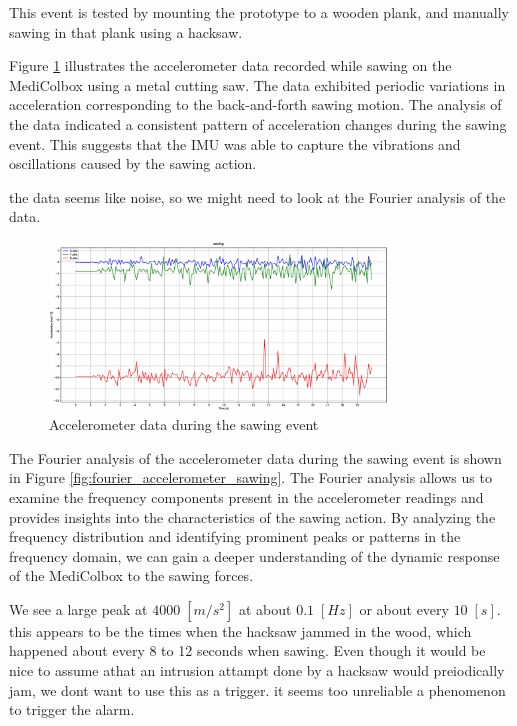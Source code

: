 \documentclass[../main.tex]{subfiles}
\begin{document}
This event is tested by mounting the prototype to a wooden plank, and manually sawing in that plank using a hacksaw.

Figure \ref{fig:accelerometer_sawing} illustrates the
accelerometer data recorded while sawing on the
MediColbox using a metal cutting saw.
The data exhibited periodic variations in acceleration
corresponding to the back-and-forth sawing motion.
The analysis of the data indicated a consistent pattern of
acceleration changes during the sawing event. This suggests that the IMU was able to capture the vibrations and oscillations caused by the sawing action.

the data seems like noise, so we might need to look at the Fourier analysis of the data.

\begin{figure}[htbp]
    \centering
    \includegraphics[width=0.8\textwidth]{resources/figures/Acceleration_sawing.eps}
    \caption{Accelerometer data during the sawing event}
    \label{fig:accelerometer_sawing}
\end{figure}

The Fourier analysis of the accelerometer data during the sawing event is shown in Figure \ref{fig:fourier_accelerometer_sawing}. The Fourier analysis allows us to examine the frequency components present in the accelerometer readings and provides insights into the characteristics of the sawing action. By analyzing the frequency distribution and identifying prominent peaks or patterns in the frequency domain, we can gain a deeper understanding of the dynamic response of the MediColbox to the sawing forces.

We see a large peak at $4000\;[m/s^2]$ at about $0.1\;[Hz]$ or about every $10\;[s]$. this appears to be the times when the hacksaw jammed in the wood, which happened about every 8 to 12 seconds when sawing. Even though it would be nice to assume athat an intrusion attampt done by a hacksaw would preiodically jam, we dont want to use this as a trigger. it seems too unreliable a phenomenon to trigger the alarm.
\end{document}
